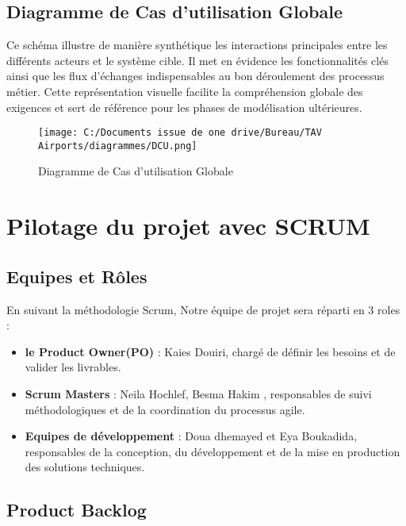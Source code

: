 \documentclass[a4paper,11pt]{report}
\begin{document}
\newpage
\subsection{Diagramme de Cas d'utilisation Globale}


Ce schéma illustre de manière synthétique les interactions principales entre les différents acteurs et le système cible.  
Il met en évidence les fonctionnalités clés ainsi que les flux d’échanges indispensables au bon déroulement des processus métier.  
Cette représentation visuelle facilite la compréhension globale des exigences et sert de référence pour les phases de modélisation ultérieures.

\begin{figure}[H]
\centering
\texttt{[image: C:/Documents issue de one drive/Bureau/TAV Airports/diagrammes/DCU.png]}
\caption{Diagramme de Cas d'utilisation Globale}
\end{figure}

\newpage
\section{Pilotage du projet avec SCRUM}

\subsection{Equipes et Rôles }

\par En suivant la méthodologie Scrum, Notre équipe de projet sera réparti en 3 roles :
\begin{itemize}[label = --]
	\item \textbf{le Product Owner(PO)} : Kaies Douiri, chargé de définir les besoins et de valider les livrables.
	
	\item \textbf{Scrum Masters} : Neila Hochlef, Besma Hakim , responsables de suivi méthodologiques et de la coordination du processus agile.
	\item \textbf{Equipes de développement} : Doua dhemayed et Eya Boukadida, responsables de la conception, du développement et de la mise en production des solutions techniques.\\
	 
\end{itemize}
\par

\subsection{Product Backlog}
\end{document}
